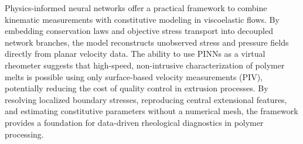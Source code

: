Physics-informed neural networks offer a practical framework to combine
kinematic measurements with constitutive modeling in viscoelastic flows. By
embedding conservation laws and objective stress transport into decoupled
network branches, the model reconstructs unobserved stress and pressure fields
directly from planar velocity data. The ability to use PINNs as a virtual
rheometer suggests that high-speed, non-intrusive characterization of polymer
melts is possible using only surface-based velocity measurements (PIV),
potentially reducing the cost of quality control in extrusion processes. By
resolving localized boundary stresses, reproducing central extensional features,
and estimating constitutive parameters without a numerical mesh, the framework
provides a foundation for data-driven rheological diagnostics in polymer
processing.
